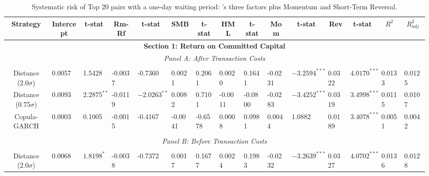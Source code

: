 \documentclass[a4paper]{article}
\begin{document}
\begin{sidewaystable}
	\caption{Systematic risk of Top 20 pairs with a one-day waiting period: \citet*{ff93}'s three factors plus Momentum and Short-Term Reversal.}
	\begin{threeparttable}[H]
		\centering \scriptsize
		\begin{tabularx}{\textwidth}{@{\extracolsep{\fill}}lllllllllllllll@{}}
			\toprule
			\multicolumn{1}{c}{Strategy} & \multicolumn{1}{c}{Intercept} & \multicolumn{1}{c}{t-stat} & \multicolumn{1}{c}{Rm-Rf} & \multicolumn{1}{c}{t-stat} & \multicolumn{1}{c}{SMB} & \multicolumn{1}{c}{t-stat} & \multicolumn{1}{c}{HML} & \multicolumn{1}{c}{t-stat} & \multicolumn{1}{c}{Mom} & \multicolumn{1}{c}{t-stat} & \multicolumn{1}{c}{Rev} & \multicolumn{1}{c}{t-stat} & \multicolumn{1}{c}{$R^{2}$} & \multicolumn{1}{c}{$R^{2}_{adj}$} \\
			\midrule
			\multicolumn{15}{c}{\textbf{Section 1: Return on Committed Capital}} \\
			\multicolumn{15}{c}{\textit{Panel A: After Transaction Costs}} \\
			\multicolumn{1}{c}{} & \multicolumn{1}{c}{} & \multicolumn{1}{c}{} & \multicolumn{1}{c}{} & \multicolumn{1}{c}{} & \multicolumn{1}{c}{} & \multicolumn{1}{c}{} & \multicolumn{1}{c}{} &       &       &       &       &       &       &  \\
			\multicolumn{1}{c}{Distance (2.0$\sigma$)} & 0.0057 & 1.5428 & -0.0037 & -0.7360 & 0.0021 & 0.2061 & 0.0020 & 0.1641 & -0.0231 & $-3.2594^{***}$ & 0.0322 & $4.0170^{***}$ & 0.0133 & 0.0125 \\
			\multicolumn{1}{c}{Distance (0.75$\sigma$)} & 0.0093 & $2.2875^{**}$ & -0.0119 & $-2.0263^{**}$ & 0.0082 & 0.7101 & -0.0011 & -0.0800 & -0.0283 & $-3.4252^{***}$ & 0.0319 & $3.4998^{***}$ & 0.0115 & 0.0107 \\
			\multicolumn{1}{c}{Copula-GARCH} & 0.0003 & 0.1005 & -0.0015 & -0.4167 & -0.0041 & -0.6578 & 0.0008 & 0.0981 & 0.0044 & 1.0882 & 0.0189 & $3.4078^{***}$ & 0.0051 & 0.0042 \\
			&       &       &       &       &       &       &       &       &       &       &       &       &       &  \\
			\multicolumn{15}{c}{\textit{Panel B: Before Transaction Costs}} \\
			&       &       &       &       &       &       &       &       &       &       &       &       &       &  \\
			\multicolumn{1}{c}{Distance (2.0$\sigma$)} & 0.0068 & $1.8198^{*}$ & -0.0038 & -0.7372 & 0.0017 & 0.1677 & 0.0024 & 0.1983 & -0.0232 & $-3.2639^{***}$ & 0.0327 & $4.0702^{***}$ & 0.0136 & 0.0128 \\

\end{tabularx}
\end{threeparttable}
\end{sidewaystable}
\end{document}
